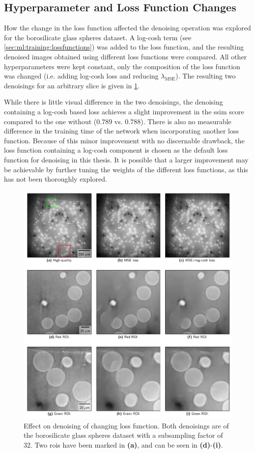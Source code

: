 \subsection{Hyperparameter and Loss Function Changes}
How the change in the loss function affected the denoising operation was explored for the borosilicate glass spheres dataset. A log-cosh term (see \cref{sec:ml:training:lossfunctions}) was added to the loss function, and the resulting denoised images obtained using different loss functions were compared. All other hyperparameters were kept constant, only the composition of the loss function was changed (i.e. adding log-cosh loss and reducing $\lambda_{\text{MSE}}$). The resulting two denoisings for an arbitrary slice is given in \cref{fig:losschangedenoisingcomparison}. 

While there is little visual difference in the two denoisings, the denoising containing a log-cosh based loss achieves a slight improvement in the \gls{ssim} score compared to the one without ($0.789$ vs. $0.788$). There is also no measurable difference in the training time of the network when incorporating another loss function. Because of this minor improvement with no discernable drawback, the loss function containing a log-cosh component is chosen as the default loss function for denoising in this thesis. It is possible that a larger improvement may be achievable by further tuning the weights of the different loss functions, as this has not been thoroughly explored. 

\begin{figure}[htbp]
  \centering
  \includegraphics[width=.9\textwidth]{figures/losschangedenoisingcomparison.pdf}
  \caption[Effect on denoising of changing loss function]{Effect on denoising of changing loss function. Both denoisings are of the borosilicate glass spheres dataset with a subsampling factor of 32. Two \gls{roi}s have been marked in \textbf{(a)}, and can be seen in \textbf{(d)}-\textbf{(i)}. }
  \label{fig:losschangedenoisingcomparison}
\end{figure}

